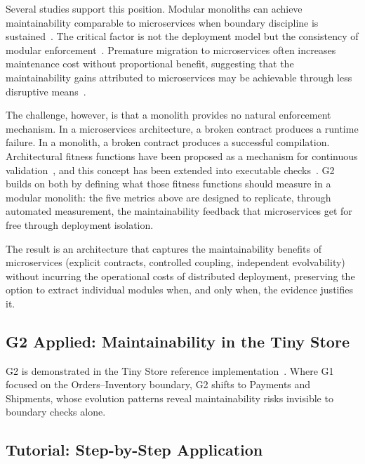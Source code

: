 Several studies support this position. Modular monoliths can achieve maintainability comparable to microservices when boundary discipline is sustained~\cite{gravanis2021dont,blinowski2022monolithic}. The critical factor is not the deployment model but the consistency of modular enforcement~\cite{wolfart2021modernizing}. Premature migration to microservices often increases maintenance cost without proportional benefit, suggesting that the maintainability gains attributed to microservices may be achievable through less disruptive means~\cite{berry2024isItWorth}.

The challenge, however, is that a monolith provides no natural enforcement mechanism. In a microservices architecture, a broken contract produces a runtime failure. In a monolith, a broken contract produces a successful compilation. Architectural fitness functions have been proposed as a mechanism for continuous validation~\cite{FordParsons2017}, and this concept has been extended into executable checks~\cite{thoughtworks2017fitnessfunction}. G2 builds on both by defining what those fitness functions should measure in a modular monolith: the five metrics above are designed to replicate, through automated measurement, the maintainability feedback that microservices get for free through deployment isolation.

The result is an architecture that captures the maintainability benefits of microservices (explicit contracts, controlled coupling, independent evolvability) without incurring the operational costs of distributed deployment, preserving the option to extract individual modules when, and only when, the evidence justifies it.

\subsection*{G2 Applied: Maintainability in the Tiny Store}
\label{sec:g2-applied}

G2 is demonstrated in the Tiny Store reference implementation~\cite{tinystore2026}. Where G1 focused on the Orders--Inventory boundary, G2 shifts to Payments and Shipments, whose evolution patterns reveal maintainability risks invisible to boundary checks alone.

\subsection*{Tutorial: Step-by-Step Application}

